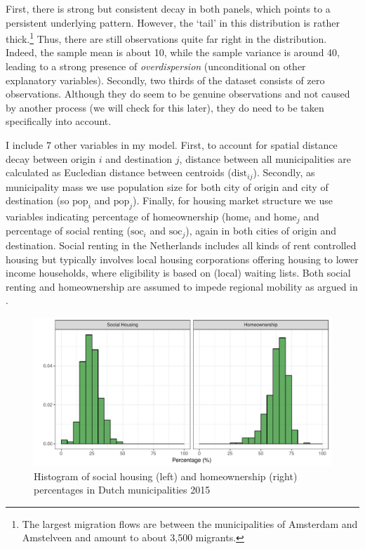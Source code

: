\documentclass[fleqn,10pt]{SelfArx} %
\begin{document}
        First, there is strong but consistent decay in both panels,
        which points to a persistent underlying pattern. However, the
        `tail' in this distribution is rather thick.\footnote{The
          largest migration flows are between the municipalities of
          Amsterdam and Amstelveen and amount to about 3,500
          migrants.} Thus, there are still observations quite far
        right in the distribution. Indeed, the sample mean is about
        10, while the sample variance is around 40, leading to a
        strong presence of \emph{overdispersion} (unconditional on
        other explanatory variables).  Secondly, two thirds of the
        dataset consists of zero observations. Although they do seem
        to be genuine observations and not caused by another process
        (we will check for this later), they do need to be taken
        specifically into account.

        I include 7 other variables in my model. First, to account for
        spatial distance decay between origin $i$ and destination $j$,
        distance between all municipalities are calculated as
        Eucledian distance between centroids
        ($\text{dist}_{ij}$). Secondly, as municipality mass we use
        population size for both city of origin and city of
        destination (so $\text{pop}_i$ and $\text{pop}_j$). Finally,
        for housing market structure we use variables indicating
        percentage of homeownership ($\text{home}_i$ and
        $\text{home}_j$ and percentage of social renting
        ($\text{soc}_i$ and $\text{soc}_j$), again in both cities of
        origin and destination. Social renting in the Netherlands
        includes all kinds of rent controlled housing but typically
        involves local housing corporations offering housing to lower
        income households, where eligibility is based on (local)
        waiting lists. Both social renting and homeownership are
        assumed to impede regional mobility as argued in
        \citep{de2009homeownership}.

        \begin{figure}[ht]\centering %
          \includegraphics[width=0.8\linewidth]{../fig/hist_housing.pdf}
          \caption{Histogram of social housing (left) and
            homeownership (right) percentages in Dutch municipalities
            2015}
            \label{fig:housing_mig}
        \end{figure}
\end{document}
